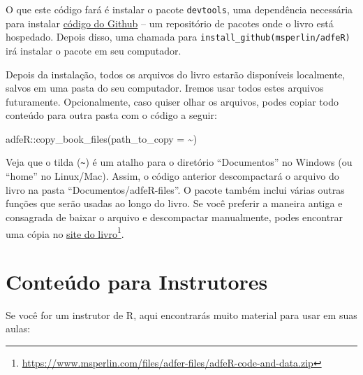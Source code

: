 \documentclass[
  11pt,
]{book}
\newenvironment{Shaded}{\begin{snugshade}}{\end{snugshade}}
\newcommand{\AttributeTok}[1]{\textcolor[rgb]{0.61,0.61,0.61}{#1}}
\newcommand{\FunctionTok}[1]{\textcolor[rgb]{0,0,0}{#1}}
\newcommand{\NormalTok}[1]{#1}
\newcommand{\SpecialCharTok}[1]{\textcolor[rgb]{0,0,0}{#1}}
\newcommand{\StringTok}[1]{\textcolor[rgb]{0.5,0.5,0.5}{#1}}
\begin{document}
O que este código fará é instalar o pacote \texttt{devtools}, uma dependência necessária para instalar \href{https://github.com/msperlin/adfeR}{código do Github} -- um repositório de pacotes onde o livro está hospedado. Depois disso, uma chamada para \texttt{install\_github(\textquotesingle{}msperlin/adfeR\textquotesingle{})} irá instalar o pacote em seu computador.

Depois da instalação, todos os arquivos do livro estarão disponíveis localmente, salvos em uma pasta do seu computador. Iremos usar todos estes arquivos futuramente. Opcionalmente, caso quiser olhar os arquivos, podes copiar todo conteúdo para outra pasta com o código a seguir:

\begin{Shaded}
\begin{Highlighting}[]
\NormalTok{adfeR}\SpecialCharTok{::}\FunctionTok{copy\_book\_files}\NormalTok{(}\AttributeTok{path\_to\_copy =} \StringTok{\textquotesingle{}\textasciitilde{}\textquotesingle{}}\NormalTok{)}
\end{Highlighting}
\end{Shaded}

Veja que o tilda (\texttt{\textasciitilde{}}) é um atalho para o diretório ``Documentos'' no Windows (ou ``home'' no Linux/Mac). Assim, o código anterior descompactará o arquivo do livro na pasta ``Documentos/adfeR-files''. O pacote também inclui várias outras funções que serão usadas ao longo do livro. Se você preferir a maneira antiga e consagrada de baixar o arquivo e descompactar manualmente, podes encontrar uma cópia no \href{https://www.msperlin.com/files/adfer-files/adfeR-code-and-data.zip}{site do livro}\footnote{\url{https://www.msperlin.com/files/adfer-files/adfeR-code-and-data.zip}}.

\hypertarget{conteuxfado-para-instrutores}{%
\section*{Conteúdo para Instrutores}\label{conteuxfado-para-instrutores}}

Se você for um instrutor de R, aqui encontrarás muito material para usar em suas aulas:
\end{document}
